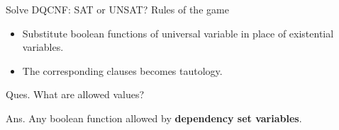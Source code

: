 \documentclass[xcolor=table	]{beamer}
\newcommand{\ov}[1]{\mkern 1.5mu\overline{\mkern-1.5mu#1\mkern-1.5mu}\mkern 1.5mu}
\begin{document}
\begin{frame}{Solve DQCNF: SAT or UNSAT?}
Rules of the game \\

\begin{itemize}
	\pause 
	
	\item Substitute boolean functions of universal variable in place of existential variables.
	\pause
	
	\item The corresponding clauses becomes tautology.
\end{itemize}
\pause
 
Ques. What are allowed values? \\
\pause

Ans. Any boolean function allowed by \textbf{dependency set variables}.
\end{frame}

%
%


\end{document}
